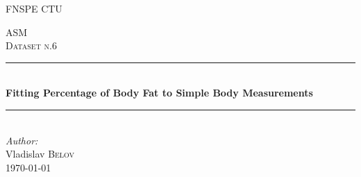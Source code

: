 \documentclass[11pt,american,american]{article}
\begin{document}
\def\documentdate{...}


\begin{titlepage} %
	\newcommand{\HRule}{\rule{\linewidth}{0.5mm}} %
	\center %
	
	\textsc{\LARGE FNSPE CTU}\\[1.5cm] %
	\vfill
	
	
	\textsc{\Large ASM}\\[0.5cm] %
	\textsc{\large Dataset n.6}\\[0.5cm] %
	\HRule\\[0.4cm]
	{\huge\bfseries Fitting Percentage of Body Fat to Simple Body Measurements}\\[0.4cm] %
	\HRule\\[1.5cm]
	{\large\textit{Author:}}\\
	Vladislav \textsc{Belov}\\
	\vfill\vfill\vfill\vfill\vfill\vfill\vfill %
	{\large\today} %
	

\end{titlepage}
\end{document}
